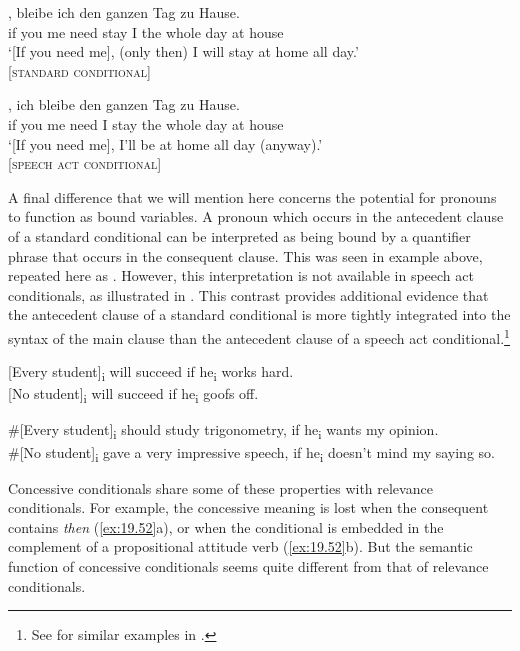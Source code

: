 \ea \label{ex:19.49}
\ea   \gll{},  bleibe  ich  den  ganzen  Tag  zu  Hause.\\
 if  you  me  need  stay  I  the  whole  day  at  house\\
\glt ‘[If you need me], (only then) I will stay at home all day.’ \\
\hfill [\textsc{standard conditional}]

\ex
  \gll{},  ich  bleibe  den  ganzen  Tag  zu  Hause.\\
 if  you  me  need  I  stay  the  whole  day  at  house\\
\glt ‘[If you need me], I’ll be at home all day (anyway).’ \\
\hfill [\textsc{speech act} \textsc{conditional}]
\z
\z

A final difference that we will mention here concerns the potential for pronouns to function as bound variables. A pronoun which occurs in the antecedent clause of a standard conditional can be interpreted as being bound by a quantifier phrase that occurs in the consequent clause. This was seen in example  above, repeated here as . However, this interpretation is not available in speech act conditionals, as illustrated in . This contrast provides additional evidence that the antecedent clause of a standard conditional is more tightly integrated into the syntax of the main clause than the antecedent clause of a speech act conditional.\footnote{See \citet{EbertEtAl2008} for similar examples in .}


\ea \label{ex:19.50}
\ea {} [Every student]\textsubscript{i} will succeed if he\textsubscript{i} works hard.\\
\ex{} [No student]\textsubscript{i} will succeed if he\textsubscript{i} goofs off.
\z
\z

\ea \label{ex:19.51}
\ea  \#[Every student]\textsubscript{i} should study trigonometry, if he\textsubscript{i} wants my opinion.\\
\ex \#[No student]\textsubscript{i} gave a very impressive speech, if he\textsubscript{i} doesn’t mind my saying so.
\z
\z

Concessive conditionals share some of these properties with relevance conditionals. For example, the concessive meaning is lost when the consequent contains \textit{then} (\ref{ex:19.52}a), or when the conditional is embedded in the complement of a propositional attitude verb (\ref{ex:19.52}b). But the semantic function of concessive conditionals seems quite different from that of relevance conditionals.


